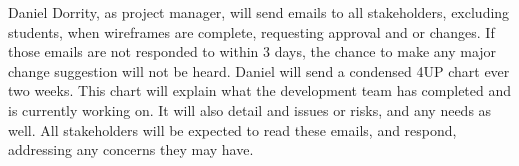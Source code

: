 Daniel Dorrity, as project manager, will send emails to all stakeholders, excluding students, when wireframes are complete, requesting approval and or changes. If those emails are not responded to within 3 days, the chance to make any major change suggestion will not be heard. Daniel will send a condensed 4UP chart ever two weeks. This chart will explain what the development team has completed and is currently working on. It will also detail and issues or risks, and any needs as well. All stakeholders will be expected to read these emails, and respond, addressing any concerns they may have.